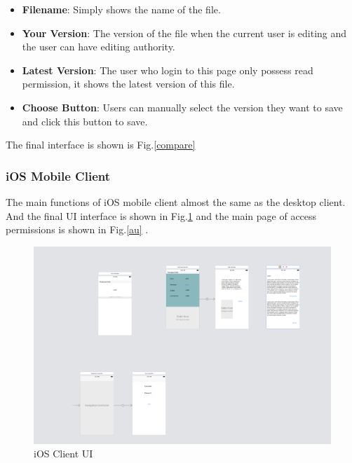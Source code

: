   \begin{itemize}
      \item \textbf{Filename}: Simply shows the name of the file.
      \item \textbf{Your Version}: The version of the file when the current user is editing and the user can have editing authority.
      \item \textbf{Latest Version}: The user who login to this page only possess read permission, it shows the latest version of this file.
      \item \textbf{Choose Button}: Users can manually select the version they want to save and click this button to save.
  \end{itemize}
\noindent The final interface is shown is Fig.\ref{compare} 
    

\subsubsection{iOS Mobile Client}
\noindent The main functions of iOS mobile client almost the same as the desktop client. And the final UI interface is shown in Fig.\ref{iuie} and the main page of 
access permissions is shown in Fig.\ref{au} .

  \begin{figure}[H]
     \centering
     \includegraphics[width=.8\textwidth]{iui.png}
     \caption{iOS Client UI}
     \label{iuie}
\end{figure}

